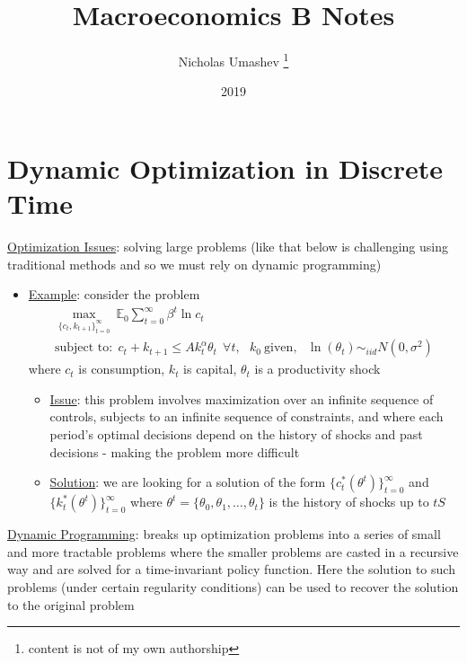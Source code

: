 \documentclass{article}
\title{Macroeconomics B Notes}
\author{Nicholas Umashev \footnote{content is not of my own authorship}}
\date{2019}
\begin{document}
\maketitle

\tableofcontents

\newpage

\section{Dynamic Optimization in Discrete Time}

\par \underline{Optimization Issues}: solving large problems (like that below is challenging using traditional methods and so we must rely on dynamic programming)
\begin{itemize}
    \item  \underline{Example}: consider the problem
    \begin{gather*}
        \max_{\{c_{t},k_{t+1}\}^{\infty}_{t=0}} \ \mathbb{E}_{0} \sum_{t=0}^{\infty} \beta^{t} \ln c_{t} \\ \text{subject to:} \ \ c_{t}+k_{t+1} \leq Ak_{t}^{\alpha}\theta_{t} \ \ \forall t, \ \ \ k_{0} \ \text{given}, \ \ \ \ln(\theta_{t}) \sim_{iid} N(0, \sigma^{2})
    \end{gather*}
    where $c_{t}$ is consumption, $k_{t}$ is capital, $\theta_{t}$ is a productivity shock
    \begin{itemize}
        \item  \underline{Issue}: this problem involves maximization over an infinite sequence of controls, subjects to an infinite sequence of constraints, and where each period's optimal decisions depend on the history of shocks and past decisions - making the problem more difficult
        \item \underline{Solution}: we are looking for a solution of the form $\{c_{t}^{*}(\theta^{t})\}_{t=0}^{\infty}$ and $\{k_{t}^{*}(\theta^{t})\}_{t=0}^{\infty}$ where $\theta^{t} = \{ \theta_{0}, \theta_{1}, \dots, \theta_{t} \}$ is the history of shocks up to $tS$
    \end{itemize}
\end{itemize}
\vspace{2.5mm}
\par \underline{Dynamic Programming}: breaks up optimization problems into a series of small and more tractable problems where the smaller problems are casted in a recursive way and are solved for a time-invariant policy function. Here the solution to such problems (under certain regularity conditions) can be used to recover the solution to the original problem
\end{document}
